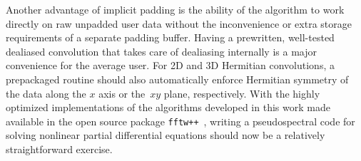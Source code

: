 \documentclass[final]{siamltex}
\begin{document}
Another advantage of implicit padding is the ability of the algorithm to
work directly on raw unpadded user data without the inconvenience or extra
storage requirements of a separate padding buffer. 
Having a prewritten, well-tested dealiased convolution that
takes care of dealiasing internally is a major convenience for the average user.
For 2D and 3D Hermitian convolutions, a prepackaged routine should also
automatically enforce Hermitian symmetry of the data along the $x$ axis or
the~$xy$ plane, respectively. With the highly optimized implementations of
the algorithms developed in this work made available in the open source
package {\tt fftw++}~\cite{fftwpp}, writing a pseudospectral code for
solving nonlinear partial differential equations should now be a relatively
straightforward exercise.



\end{document}
